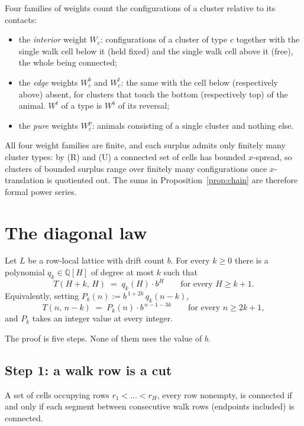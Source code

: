 \documentclass[11pt]{article}
\newcommand{\Q}{\mathbb{Q}}
\begin{document}
Four families of weights count the configurations of a cluster relative to its
contacts:
\begin{itemize}
\item the \emph{interior} weight $W_c$: configurations of a cluster of type $c$
  together with the single walk cell below it (held fixed) and the single walk
  cell above it (free), the whole being connected;
\item the \emph{edge} weights $W^b_c$ and $W^t_c$: the same with the cell below
  (respectively above) absent, for clusters that touch the bottom (respectively
  top) of the animal. $W^t$ of a type is $W^b$ of its reversal;
\item the \emph{pure} weights $W^p_c$: animals consisting of a single cluster and
  nothing else.
\end{itemize}

All four weight families are finite, and each surplus admits only finitely
many cluster types: by (R) and (U) a connected set of cells has bounded
$x$-spread, so clusters of bounded surplus range over finitely many
configurations once $x$-translation is quotiented out. The sums in
Proposition~\ref{prop:chain} are therefore formal power series.

\section{The diagonal law}
\label{sec:A}

\begin{theorem}
\label{thm:A}
Let $L$ be a row-local lattice with drift count $b$. For every $k \ge 0$ there is
a polynomial $q_k \in \Q[H]$ of degree at most $k$ such that
\[
  T(H+k,\,H) \;=\; q_k(H)\cdot b^{H}
  \qquad\text{for every } H \ge k+1 .
\]
Equivalently, setting $P_k(n) := b^{\,1+2k}\, q_k(n-k)$,
\[
  T(n,\,n-k) \;=\; P_k(n)\cdot b^{\,n-1-3k}
  \qquad\text{for every } n \ge 2k+1 ,
\]
and $P_k$ takes an integer value at every integer.
\end{theorem}

The proof is five steps. None of them uses the value of $b$.

\subsection*{Step 1: a walk row is a cut}

\begin{lemma}[separation]
\label{lem:sep}
A set of cells occupying rows $r_1 < \dots < r_H$, every row nonempty, is
connected if and only if each segment between consecutive walk rows (endpoints
included) is connected.
\end{lemma}
\end{document}
